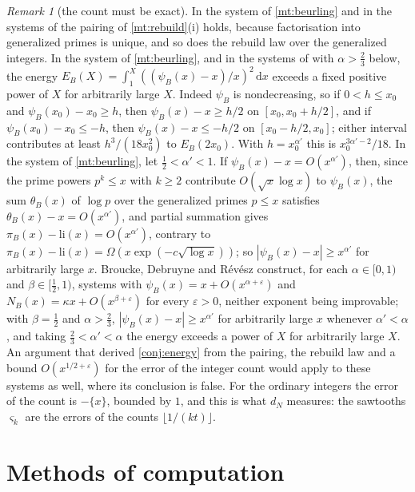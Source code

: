 \documentclass[11pt]{article}
\theoremstyle{definition}\newtheorem{definition}[theorem]{Definition}
\theoremstyle{remark}\newtheorem{remark}[theorem]{Remark}
\newcommand{\dd}{\,\mathrm d}\newcommand{\e}{\mathrm e}
\newcommand{\fr}[1]{\{#1\}}
\begin{document}
\begin{remark}[the count must be exact]\label{rem:exact}
In the system of \cref{mt:beurling} and in the systems of \cite{BDR} the pairing of \cref{mt:rebuild}(i) holds, because factorisation into generalized primes is unique, and so does the rebuild law over the generalized integers. In the system of \cref{mt:beurling}, and in the systems of \cite{BDR} with $\alpha>\frac23$ below, the energy $E_B(X)=\int_1^X((\psi_B(x)-x)/x)^2\dd x$ exceeds a fixed positive power of $X$ for arbitrarily large $X$. Indeed $\psi_B$ is nondecreasing, so if $0<h\le x_0$ and $\psi_B(x_0)-x_0\ge h$, then $\psi_B(x)-x\ge h/2$ on $[x_0,x_0+h/2]$, and if $\psi_B(x_0)-x_0\le-h$, then $\psi_B(x)-x\le-h/2$ on $[x_0-h/2,x_0]$; either interval contributes at least $h^3/(18x_0^2)$ to $E_B(2x_0)$. With $h=x_0^{\alpha'}$ this is $x_0^{3\alpha'-2}/18$. In the system of \cref{mt:beurling}, let $\frac12<\alpha'<1$. If $\psi_B(x)-x=O(x^{\alpha'})$, then, since the prime powers $p^k\le x$ with $k\ge2$ contribute $O(\sqrt x\log x)$ to $\psi_B(x)$, the sum $\theta_B(x)$ of $\log p$ over the generalized primes $p\le x$ satisfies $\theta_B(x)-x=O(x^{\alpha'})$, and partial summation gives $\pi_B(x)-\mathrm{li}(x)=O(x^{\alpha'})$, contrary to $\pi_B(x)-\mathrm{li}(x)=\Omega(x\exp(-c\sqrt{\log x}))$; so $|\psi_B(x)-x|\ge x^{\alpha'}$ for arbitrarily large $x$. Broucke, Debruyne and R\'ev\'esz \cite{BDR} construct, for each $\alpha\in[0,1)$ and $\beta\in[\frac12,1)$, systems with $\psi_B(x)=x+O(x^{\alpha+\varepsilon})$ and $N_B(x)=\kappa x+O(x^{\beta+\varepsilon})$ for every $\varepsilon>0$, neither exponent being improvable; with $\beta=\frac12$ and $\alpha>\frac23$, $|\psi_B(x)-x|\ge x^{\alpha'}$ for arbitrarily large $x$ whenever $\alpha'<\alpha$, and taking $\frac23<\alpha'<\alpha$ the energy exceeds a power of $X$ for arbitrarily large $X$. An argument that derived \cref{conj:energy} from the pairing, the rebuild law and a bound $O(x^{1/2+\varepsilon})$ for the error of the integer count would apply to these systems as well, where its conclusion is false. For the ordinary integers the error of the count is $-\fr x$, bounded by $1$, and this is what $d_N$ measures: the sawtooths $\varsigma_k$ are the errors of the counts $\lfloor1/(kt)\rfloor$.
\end{remark}

\section{Methods of computation}\label{sec:methods}
\end{document}

